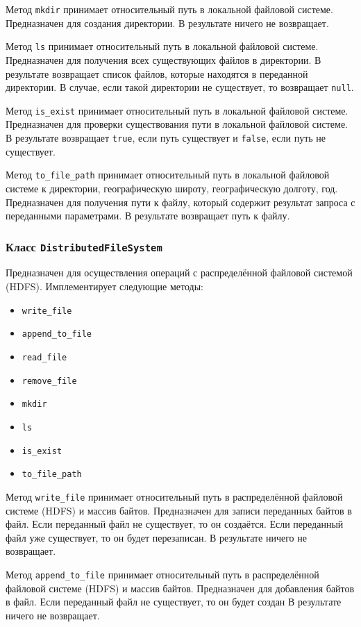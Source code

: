 Метод \texttt{mkdir} принимает относительный путь в локальной файловой системе.
Предназначен для создания директории. 
В результате ничего не возвращает.

Метод \texttt{ls} принимает относительный путь в локальной файловой системе.
Предназначен для получения всех существующих файлов в директории.
В результате возвращает список файлов, которые находятся в переданной директории.
В случае, если такой директории не существует, то возвращает \texttt{null}.

Метод \texttt{is\_exist} принимает относительный путь в локальной файловой системе.
Предназначен для проверки существования пути в локальной файловой системе.
В результате возвращает \texttt{true}, если путь существует и \texttt{false}, если путь не существует.

Метод \texttt{to\_file\_path} принимает относительный путь в локальной файловой системе к директории, географическую широту, географическую долготу, год.
Предназначен для получения пути к файлу, который содержит результат запроса с переданными параметрами.
В результате возвращает путь к файлу.


\subsubsection{Класс \texttt{DistributedFileSystem}}
Предназначен для осуществления операций с распределённой файловой системой (HDFS).
Имплементирует следующие методы:
\begin{itemize}
    \item \texttt{write\_file}
    \item \texttt{append\_to\_file}
    \item \texttt{read\_file}
    \item \texttt{remove\_file}
    \item \texttt{mkdir}
    \item \texttt{ls}
    \item \texttt{is\_exist}
    \item \texttt{to\_file\_path}
\end{itemize}

Метод \texttt{write\_file} принимает относительный путь в распределённой файловой системе (HDFS) и массив байтов.
Предназначен для записи переданных байтов в файл.
Если переданный файл не существует, то он создаётся.
Если переданный файл уже существует, то он будет перезаписан.
В результате ничего не возвращает.

Метод \texttt{append\_to\_file} принимает относительный путь в распределённой файловой системе (HDFS) и массив байтов.
Предназначен для добавления байтов в файл.
Если переданный файл не существует, то он будет создан
В результате ничего не возвращает.

